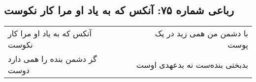 \begin{center}
\section*{رباعی شماره ۷۵: آنکس که به یاد او مرا کار نکوست}
\label{sec:sh075}
\begin{longtable}{l p{0.5cm} r}
آنکس که به یاد او مرا کار نکوست
&&
با دشمن من همی زید در یک پوست
\\
گر دشمن بنده را همی دارد دوست
&&
بدبختی بنده‌ست نه بدعهدی اوست
\\
\end{longtable}
\end{center}
